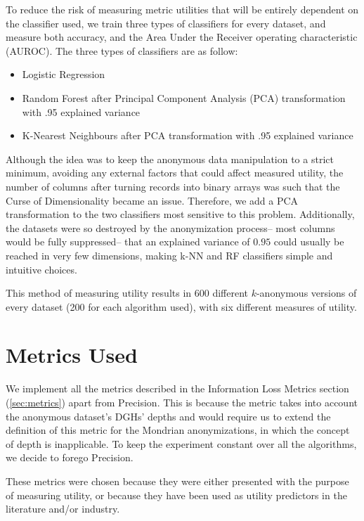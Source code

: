 To reduce the risk of measuring metric utilities that will be entirely dependent on the classifier used, we train three types of classifiers for every dataset, and measure both accuracy, and the Area Under the Receiver operating characteristic (AUROC). The three types of classifiers are as follow: 

\begin{itemize}
    \item Logistic Regression
    \item Random Forest after Principal Component Analysis (PCA) transformation with .95 explained variance
    \item K-Nearest Neighbours after PCA transformation with .95 explained variance
\end{itemize}
Although the idea was to keep the anonymous data manipulation to a strict minimum, avoiding any external factors that could affect measured utility, the number of columns after turning records into binary arrays was such that the Curse of Dimensionality became an issue. Therefore, we add a PCA transformation to the two classifiers most sensitive to this problem. Additionally, the datasets were so destroyed by the anonymization process-- most columns would be fully suppressed--  that an explained variance of $0.95$ could usually be reached in very few dimensions, making k-NN and RF classifiers simple and intuitive choices.

This method of measuring utility results in 600 different $k$-anonymous versions of every dataset (200 for each algorithm used), with six different measures of utility.



\section{Metrics Used}
We implement all the metrics described in the Information Loss Metrics section (\ref{sec:metrics}) apart from Precision. This is because the metric takes into account the anonymous dataset's DGHs' depths and would require us to extend the definition of this metric for the Mondrian anonymizations, in which the concept of depth is inapplicable. To keep the experiment constant over all the algorithms, we decide to forego Precision.

These metrics were chosen because they were either presented with the purpose of measuring utility, or because they have been used as utility predictors in the literature and/or industry.

